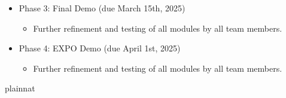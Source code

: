 \documentclass[12pt, titlepage]{article}
\newcommand{\mref}[1]{M\ref{#1}}
\begin{document}
\begin{itemize}
\begin{itemize}
\begin{itemize}
			\item Refinement, testing (Eric, Fondson)
		\end{itemize}
		\item \mref{mResults}: Results Display Module
		\begin{itemize}
			\item Refinement, testing (Eric, Fondson)
		\end{itemize}
		\item \mref{mInput}: Input Format Module
		\begin{itemize}
			\item Design and implementation (Fondson)
			\item Testing (Jason)
		\end{itemize}
		\item \mref{mOutput}: Output Generation Module
		\begin{itemize}
			\item Design and implementation (Angela, Eric)
			\item Testing (Fondson)
		\end{itemize}
		\item \mref{mBudget}: Budget Calculation Module
		\begin{itemize}
			\item Design and implementation (Jason, Payton)
			\item Testing (Eric)
		\end{itemize}
    \item \mref{mAuth}: Authentication Module
    \begin{itemize}
        \item Design and implementation (Eric)
        \item Testing (Jason)
    \end{itemize}
	\end{itemize}
	\item Phase 3: Final Demo (due March 15th, 2025)
	\begin{itemize}
		\item Further refinement and testing of all modules by all team members.
	\end{itemize}
	\item Phase 4: EXPO Demo (due April 1st, 2025)
	\begin{itemize}
		\item Further refinement and testing of all modules by all team members.
	\end{itemize}
\end{itemize}

\newpage

 {plainnat}


\newpage{}
\end{document}
